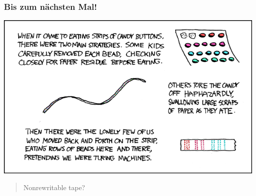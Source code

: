 \begin{frame}
\frametitle{Bis zum nächsten Mal!}
\begin{center}
  \includegraphics[height=0.8 \textheight]{images/xkcd_205.png} 
\end{center}

\begin{quote}\tiny{Nonrewritable tape?}
\end{quote}
\end{frame}


